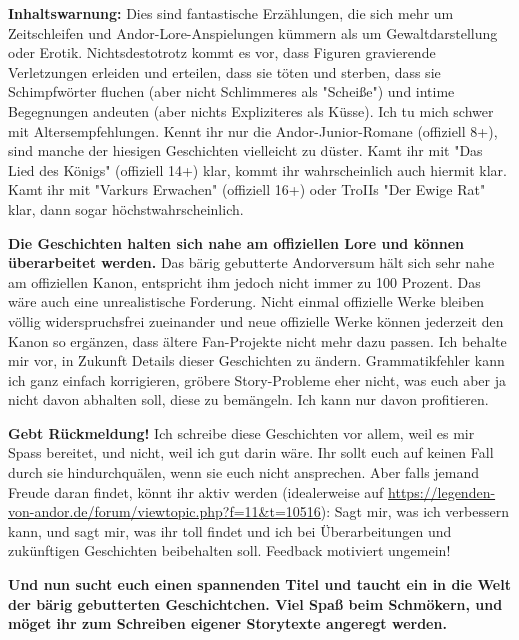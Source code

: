 \documentclass[10pt, a4paper, oneside]{book}
\begin{document}
\textbf{Inhaltswarnung:} 
Dies sind fantastische Erzählungen, die sich mehr um Zeitschleifen und Andor-Lore-Anspielungen kümmern als um Gewaltdarstellung oder Erotik. Nichtsdestotrotz kommt es vor, dass Figuren gravierende Verletzungen erleiden und erteilen, dass sie töten und sterben, dass sie Schimpfwörter fluchen (aber nicht Schlimmeres als "Scheiße") und intime Begegnungen andeuten (aber nichts Expliziteres als Küsse). Ich tu mich schwer mit Altersempfehlungen. Kennt ihr nur die Andor-Junior-Romane (offiziell 8+), sind manche der hiesigen Geschichten vielleicht zu düster. Kamt ihr mit "Das Lied des Königs" (offiziell 14+) klar, kommt ihr wahrscheinlich auch hiermit klar. Kamt ihr mit "Varkurs Erwachen" (offiziell 16+) oder TroIIs "Der Ewige Rat" klar, dann sogar höchstwahrscheinlich.
\newline

\textbf{Die Geschichten halten sich nahe am offiziellen Lore und können überarbeitet werden.}
Das bärig gebutterte Andorversum hält sich sehr nahe am offiziellen Kanon, entspricht ihm jedoch nicht immer zu 100 Prozent. Das wäre auch eine unrealistische Forderung. Nicht einmal offizielle Werke bleiben völlig widerspruchsfrei zueinander und neue offizielle Werke können jederzeit den Kanon so ergänzen, dass ältere Fan-Projekte nicht mehr dazu passen. Ich behalte mir vor, in Zukunft Details dieser Geschichten zu ändern. Grammatikfehler kann ich ganz einfach korrigieren, gröbere Story-Probleme eher nicht, was euch aber ja nicht davon abhalten soll, diese zu bemängeln. Ich kann nur davon profitieren.
\newline

\textbf{Gebt Rückmeldung!} 
Ich schreibe diese Geschichten vor allem, weil es mir Spass bereitet, und nicht, weil ich gut darin wäre. Ihr sollt euch auf keinen Fall durch sie hindurchquälen, wenn sie euch nicht ansprechen. Aber falls jemand Freude daran findet, könnt ihr aktiv werden (idealerweise auf \url{https://legenden-von-andor.de/forum/viewtopic.php?f=11&t=10516}): Sagt mir, was ich verbessern kann, und sagt mir, was ihr toll findet und ich bei Überarbeitungen und zukünftigen Geschichten beibehalten soll.
Feedback motiviert ungemein!
\newline

\textbf{Und nun sucht euch einen spannenden Titel und taucht ein in die Welt der bärig gebutterten Geschichtchen. Viel Spaß beim Schmökern, und möget ihr zum Schreiben eigener Storytexte angeregt werden.}
\newline
\end{document}
